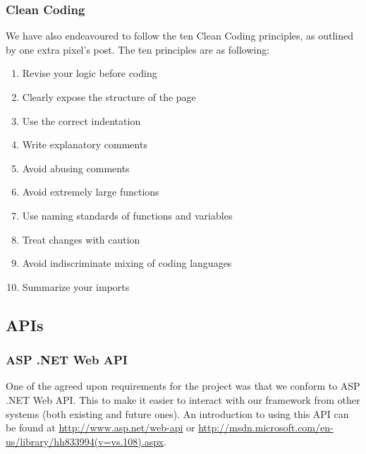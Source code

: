 \subsubsection{Clean Coding}
We have also endeavoured to follow the ten Clean Coding principles, as outlined by one extra pixel's post. \cite{cleanCoding}
The ten principles are as following:
\begin{enumerate}

\item Revise your logic before coding
\item Clearly expose the structure of the page
\item Use the correct indentation
\item Write explanatory comments
\item Avoid abusing comments
\item Avoid extremely large functions
\item Use naming standards of functions and variables
\item Treat changes with caution
\item Avoid indiscriminate mixing of coding languages
\item Summarize your imports

\end{enumerate}

\subsection{APIs}
\subsubsection{ASP .NET Web API}
One of the agreed upon requirements for the project was that we conform to ASP .NET Web API. This to make it easier to interact with our framework from other systems (both existing and future ones). An introduction to using this API can be found at \href{http://www.asp.net/web-api}{http://www.asp.net/web-api} or \href{http://msdn.microsoft.com/en-us/library/hh833994(v=vs.108).aspx}{http://msdn.microsoft.com/en-us/library/hh833994(v=vs.108).aspx}.
